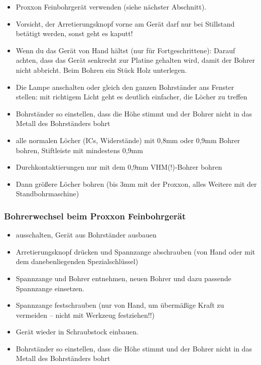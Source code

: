\documentclass{\basedir/fablab-document}
\begin{document}
\begin{itemize}
\item Proxxon Feinbohrgerät verwenden (siehe nächster Abschnitt).
\item Vorsicht, der Arretierungsknopf vorne am Gerät darf nur bei Stillstand betätigt werden, sonst geht es kaputt!
\item Wenn du das Gerät von Hand hältst (nur für Fortgeschrittene): Darauf achten, dass das Gerät senkrecht zur Platine gehalten wird, damit der Bohrer nicht abbricht. Beim Bohren ein Stück Holz unterlegen.
\item Die Lampe anschalten oder gleich den ganzen Bohrständer ans Fenster stellen: mit richtigem Licht geht es deutlich einfacher, die Löcher zu treffen
\item Bohrständer so einstellen, dass die Höhe stimmt und der Bohrer nicht in das Metall des Bohrständers bohrt
\item alle normalen Löcher (ICs, Widerstände) mit 0,8mm oder 0,9mm Bohrer bohren, Stiftleiste mit mindestens 0,9mm
\item Durchkontaktierungen nur mit dem 0,9mm VHM(!)-Bohrer bohren
\item Dann größere Löcher bohren (bis 3mm mit der Proxxon, alles Weitere mit der Standbohrmaschine)
\end{itemize}

\subsubsection{Bohrerwechsel beim Proxxon Feinbohrgerät}
\begin{itemize}
 \item ausschalten, Gerät aus Bohrständer ausbauen
 \item Arretierungsknopf drücken und Spannzange abschrauben (von Hand oder mit dem danebenliegenden Spezialschlüssel)
 \item Spannzange und Bohrer entnehmen, neuen Bohrer und dazu passende Spannzange einsetzen.
 \item Spannzange festschrauben (nur von Hand, um übermäßige Kraft zu vermeiden -- nicht mit Werkzeug festziehen!!)
 \item Gerät wieder in Schraubstock einbauen.
 \item Bohrständer so einstellen, dass die Höhe stimmt und der Bohrer nicht in das Metall des Bohrständers bohrt
\end{itemize}
\end{document}
